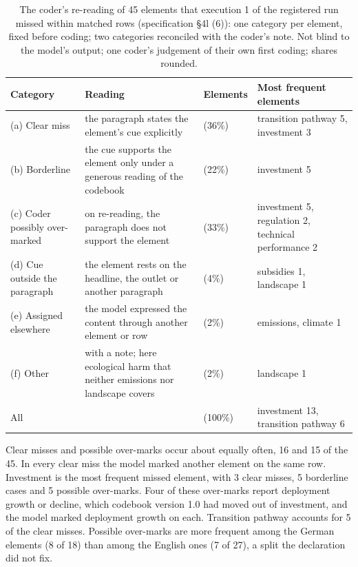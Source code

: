 \begin{table}[htbp]
\centering
\footnotesize
\setlength{\tabcolsep}{4pt}
\begin{threeparttable}
\caption[Re-reading of sampled missed elements]{The coder's re-reading of 45 elements that execution 1 of the registered run missed within matched rows (specification \S4l (6)): one category per element, fixed before coding; two categories reconciled with the coder's note. Not blind to the model's output; one coder's judgement of their own first coding; shares rounded.}
\label{tab:missed_elements}
\begin{tabular}{@{}>{\raggedright\arraybackslash}p{36mm}>{\raggedright\arraybackslash}p{56mm}>{\raggedright\arraybackslash}p{17mm}>{\raggedright\arraybackslash}p{40mm}@{}}
\toprule
\textbf{Category} & \textbf{Reading} & \textbf{Elements} & \textbf{Most frequent elements} \\
\midrule
(a) Clear miss & the paragraph states the element's cue explicitly & 16 (36\%) & transition pathway 5, investment 3 \\
(b) Borderline & the cue supports the element only under a generous reading of the codebook & 10 (22\%) & investment 5 \\
(c) Coder possibly over-marked & on re-reading, the paragraph does not support the element & 15 (33\%) & investment 5, regulation 2, technical performance 2 \\
(d) Cue outside the paragraph & the element rests on the headline, the outlet or another paragraph & 2 (4\%) & subsidies 1, landscape 1 \\
(e) Assigned elsewhere & the model expressed the content through another element or row & 1 (2\%) & emissions, climate 1 \\
(f) Other & with a note; here ecological harm that neither emissions nor landscape covers & 1 (2\%) & landscape 1 \\
\midrule
All & & 45 (100\%) & investment 13, transition pathway 6 \\
\bottomrule
\end{tabular}
\end{threeparttable}
\end{table}

Clear misses and possible over-marks occur about equally often, 16 and 15 of the 45. In every clear miss the model marked another element on the same row. Investment is the most frequent missed element, with 3 clear misses, 5 borderline cases and 5 possible over-marks. Four of these over-marks report deployment growth or decline, which codebook version 1.0 had moved out of investment, and the model marked deployment growth on each. Transition pathway accounts for 5 of the clear misses. Possible over-marks are more frequent among the German elements (8 of 18) than among the English ones (7 of 27), a split the declaration did not fix.

